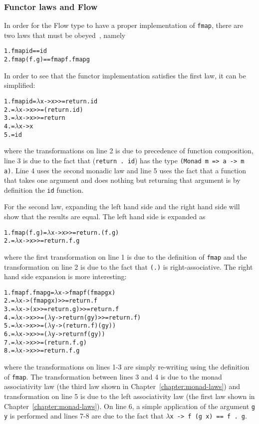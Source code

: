 \subsubsection{Functor laws and Flow}
In order for the Flow type to have a proper implementation of {\tt fmap}, there are two laws that must be obeyed~\cite{functor-laws}, namely
\begin{alltt}
  1.  fmap id  ==  id
  2.  fmap (f . g)  ==  fmap f . fmap g
\end{alltt}
In order to see that the functor implementation satisfies the first law, it can be simplified:
\begin{alltt}
  1. fmap id = \(\lambda\)x -> x >>= return . id
  2.         = \(\lambda\)x -> x >>= (return . id)
  3.         = \(\lambda\)x -> x >>= return
  4.         = \(\lambda\)x -> x
  5.         = id
\end{alltt}
where the transformations on line 2 is due to precedence of function composition, line 3 is due to the fact that ({\tt return . id}) has the type {\tt (Monad m => a -> m a)}. Line 4 uses the second monadic law and line 5 uses the fact that a function that takes one argument and does nothing but returning that argument is by definition the {\tt id} function.

For the second law, expanding the left hand side and the right hand side will show that the results are equal. The left hand side is expanded as
\begin{alltt}
  1. fmap (f . g) = \(\lambda\)x -> x >>= return . (f . g)
  2.              = \(\lambda\)x -> x >>= return . f . g
\end{alltt}
where the first transformation on line 1 is due to the definition of {\tt fmap} and the transformation on line 2 is due to the fact that {\tt (.)} is right-associative.
\newline
\newline
The right hand side expansion is more interesting:
\begin{alltt}
  1. fmap f . fmap g = \(\lambda\)x -> fmap f (fmap g x)
  2.                 = \(\lambda\)x -> (fmap g x) >>= return . f
  3.                 = \(\lambda\)x -> (x >>= return . g) >>= return . f
  4.                 = \(\lambda\)x -> x >>= (\(\lambda\)y -> return (g y) >>= return . f)
  5.                 = \(\lambda\)x -> x >>= (\(\lambda\)y -> (return . f) (g y))
  6.                 = \(\lambda\)x -> x >>= (\(\lambda\)y -> return f (g y))
  7.                 = \(\lambda\)x -> x >>= (return . f . g)
  8.                 = \(\lambda\)x -> x >>= return . f . g
\end{alltt}
where the transformations on lines 1-3 are simply re-writing using the definition of {\tt fmap}. The transformation between lines 3 and 4 is due to the monad associativity law (the third law shown in Chapter~\ref{chapter:monad-laws}) and transformation on line 5 is due to the left associativity law (the first law shown in Chapter~\ref{chapter:monad-laws}). On line 6, a simple application of the argument {\tt g y} is performed and lines 7-8 are due to the fact that {\tt \(\lambda\)x -> f (g x) == f . g}.


